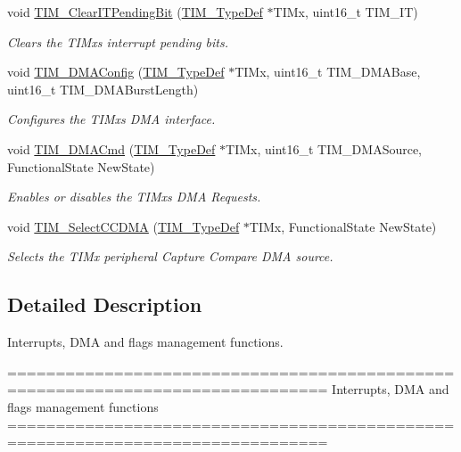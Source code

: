 \begin{DoxyCompactItemize}
void \hyperlink{group___t_i_m___group5_ga9eb1e95af71ed380f51a2c6d585cc5d6}{T\+I\+M\+\_\+\+Clear\+I\+T\+Pending\+Bit} (\hyperlink{struct_t_i_m___type_def}{T\+I\+M\+\_\+\+Type\+Def} $\ast$T\+I\+Mx, uint16\+\_\+t T\+I\+M\+\_\+\+IT)
\begin{DoxyCompactList}\small\item\em Clears the T\+I\+Mx\textquotesingle{}s interrupt pending bits. \end{DoxyCompactList}\item 
void \hyperlink{group___t_i_m___group5_gad7156f84c436c8ac92cd789611826d09}{T\+I\+M\+\_\+\+D\+M\+A\+Config} (\hyperlink{struct_t_i_m___type_def}{T\+I\+M\+\_\+\+Type\+Def} $\ast$T\+I\+Mx, uint16\+\_\+t T\+I\+M\+\_\+\+D\+M\+A\+Base, uint16\+\_\+t T\+I\+M\+\_\+\+D\+M\+A\+Burst\+Length)
\begin{DoxyCompactList}\small\item\em Configures the T\+I\+Mx\textquotesingle{}s D\+MA interface. \end{DoxyCompactList}\item 
void \hyperlink{group___t_i_m___group5_ga24700389cfa3ea9b42234933b23f1399}{T\+I\+M\+\_\+\+D\+M\+A\+Cmd} (\hyperlink{struct_t_i_m___type_def}{T\+I\+M\+\_\+\+Type\+Def} $\ast$T\+I\+Mx, uint16\+\_\+t T\+I\+M\+\_\+\+D\+M\+A\+Source, Functional\+State New\+State)
\begin{DoxyCompactList}\small\item\em Enables or disables the T\+I\+Mx\textquotesingle{}s D\+MA Requests. \end{DoxyCompactList}\item 
void \hyperlink{group___t_i_m___group5_ga5273cb65acb885fe7982827b1c6b7d75}{T\+I\+M\+\_\+\+Select\+C\+C\+D\+MA} (\hyperlink{struct_t_i_m___type_def}{T\+I\+M\+\_\+\+Type\+Def} $\ast$T\+I\+Mx, Functional\+State New\+State)
\begin{DoxyCompactList}\small\item\em Selects the T\+I\+Mx peripheral Capture Compare D\+MA source. \end{DoxyCompactList}\end{DoxyCompactItemize}


\subsection{Detailed Description}
Interrupts, D\+MA and flags management functions. 

\begin{DoxyVerb} ===============================================================================
                 Interrupts, DMA and flags management functions
 ===============================================================================  \end{DoxyVerb}
 

